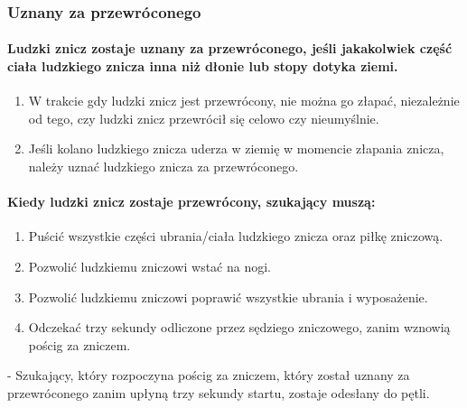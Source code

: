 \documentclass[12pt]{article}
\newcommand\other{\bgroup\color{green}\markoverwith{\textcolor{green}{\rule[-0.5ex]{2pt}{0.4pt}}}\ULon}
\begin{document}
\subsubsection{Uznany za przewróconego}

\paragraph{Ludzki znicz zostaje uznany za przewróconego, jeśli
	jakakolwiek część ciała ludzkiego znicza inna niż dłonie lub stopy
	dotyka ziemi.}

\begin{enumerate}
	\item W trakcie gdy ludzki znicz jest przewrócony, nie można go złapać,
	      niezależnie od tego, czy ludzki znicz przewrócił się celowo czy
	      nieumyślnie.

	\item Jeśli kolano ludzkiego znicza uderza w ziemię w momencie złapania
	      znicza, należy uznać ludzkiego znicza za przewróconego.
\end{enumerate}

\paragraph{Kiedy ludzki znicz zostaje przewrócony, szukający
	muszą:}

\begin{enumerate}
	\item Puścić wszystkie części ubrania/ciała ludzkiego znicza oraz piłkę
	      zniczową.

	\item Pozwolić ludzkiemu zniczowi wstać na nogi.

	\item Pozwolić ludzkiemu zniczowi poprawić wszystkie ubrania i wyposażenie.

	\item Odczekać trzy sekundy odliczone przez sędziego zniczowego, zanim
	      wznowią pościg za zniczem.
\end{enumerate}

\other{Powrót do pętli} - Szukający, który rozpoczyna pościg za zniczem,
który został uznany za przewróconego zanim upłyną trzy sekundy startu,
zostaje odesłany do pętli.
\end{document}
